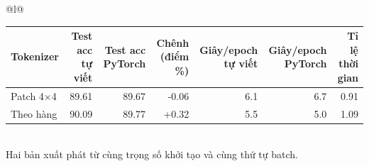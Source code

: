 \begin{tabular}{@{}l@{}}
\begin{tabular}{lrrrrrr}
\toprule
Tokenizer & Test acc tự viết & Test acc PyTorch & Chênh (điểm \%) & Giây/epoch tự viết & Giây/epoch PyTorch & Tỉ lệ thời gian \\
\midrule
Patch 4×4 & 89.61 & 89.67 & -0.06 & 6.1 & 6.7 & 0.91 \\
Theo hàng & 90.09 & 89.77 & +0.32 & 5.5 & 5.0 & 1.09 \\
\bottomrule
\end{tabular}
\\[2pt]
{\footnotesize Hai bản xuất phát từ cùng trọng số khởi tạo và cùng thứ tự batch.}
\end{tabular}
